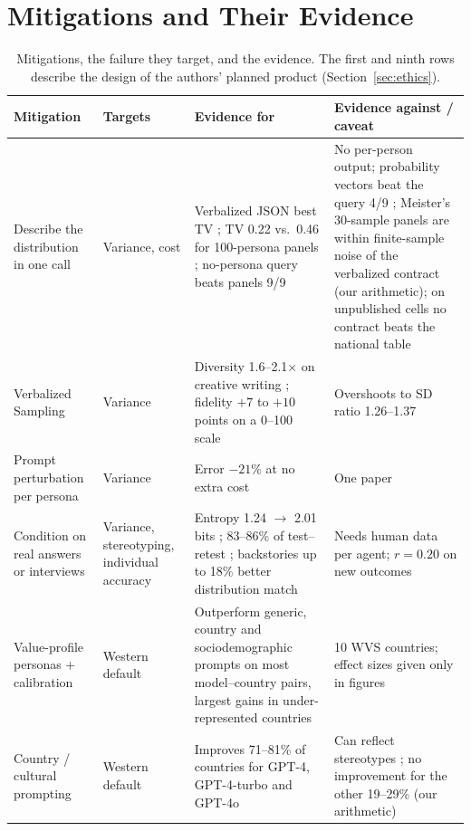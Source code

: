 \documentclass[11pt]{article}
\begin{document}
\section{Mitigations and Their Evidence}
\label{sec:mitig}

\begin{table}[!htbp]
\centering
\scriptsize
\caption{Mitigations, the failure they target, and the evidence. The first and ninth rows describe the design of the authors' planned product (Section~\ref{sec:ethics}).}
\label{tab:mitig}
\begin{tabular}{@{}L{2.8cm}L{1.9cm}L{5.2cm}L{4.4cm}@{}}
\toprule
Mitigation & Targets & Evidence for & Evidence against / caveat \\
\midrule
Describe the distribution in one call & Variance, cost & Verbalized JSON best TV \citep{meister2024}; TV 0.22 vs.\ 0.46 for 100-persona panels \citep{jang2026}; no-persona query beats panels 9/9 \citep{doudkin2026} & No per-person output; probability vectors beat the query 4/9 \citep{doudkin2026}; Meister's 30-sample panels are within finite-sample noise of the verbalized contract (our arithmetic); on unpublished cells no contract beats the national table \citep{doudkin2026} \\
Verbalized Sampling & Variance & Diversity 1.6--2.1$\times$ on creative writing \citep{zhang2025vs}; fidelity $+7$ to $+10$ points on a 0--100 scale \citep{ozkan2026} & Overshoots to SD ratio 1.26--1.37 \citep{ozkan2026} \\
Prompt perturbation per persona & Variance & Error $-21\%$ at no extra cost \citep{jang2026} & One paper \\
Condition on real answers or interviews & Variance, stereotyping, individual accuracy & Entropy 1.24 $\to$ 2.01 bits \citep{lee2026openweight}; 83--86\% of test--retest \citep{park2024}; backstories up to 18\% better distribution match \citep{moon2024anthology} & Needs human data per agent; $r=0.20$ on new outcomes \citep{peng2025funhouse} \\
Value-profile personas + calibration & Western default & Outperform generic, country and sociodemographic prompts on most model--country pairs, largest gains in under-represented countries \citep{abels2026} & 10 WVS countries; effect sizes given only in figures \\
Country / cultural prompting & Western default & Improves 71--81\% of countries for GPT-4, GPT-4-turbo and GPT-4o \citep{tao2024} & Can reflect stereotypes \citep{durmus2023}; no improvement for the other 19--29\% (our arithmetic) \\

\end{tabular}
\end{table}
\end{document}
